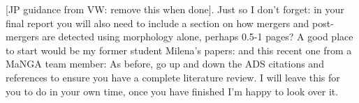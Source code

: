 [JP guidance from VW: remove this when done]. Just so I don't forget: in your final report you will also need to include a section on how mergers and post-mergers are detected using morphology alone, perhaps 0.5-1 pages? A good place to start would be my former student Milena's papers: \citet{2016MNRAS.456.3032P} 
\citet{2018MNRAS.477.1708P} 
\citet{2019NatAs...3..440P} 
and this recent one from a MaNGA team member: \citet{2019ApJ...872...76N} 
As before, go up and down the ADS citations and references to ensure you have a complete literature review. 
I will leave this for you to do in your own time, once you have finished I'm happy to look over it. 
